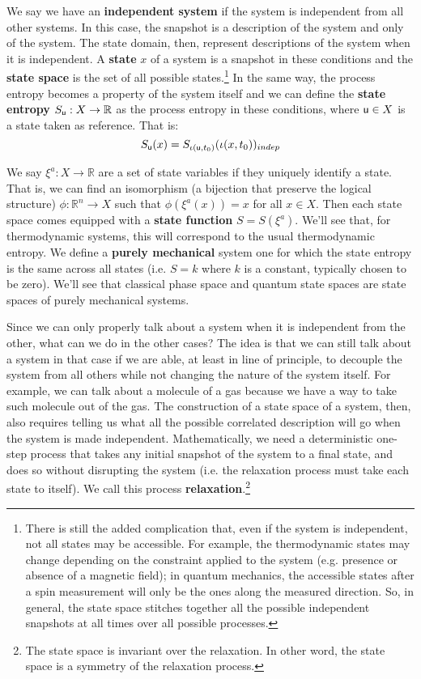 \documentclass[letterpaper]{article}
\begin{document}
We say we have an \textbf{independent system} if the system is independent from all other systems. In this case, the snapshot is a description of the system and only of the system. The state domain, then, represent descriptions of the system when it is independent. A \textbf{state} $x$ of a system is a snapshot in these conditions and the \textbf{state space} is the set of all possible states.\footnote{There is still the added complication that, even if the system is independent, not all states may be accessible. For example, the thermodynamic states may change depending on the constraint applied to the system (e.g. presence or absence of a magnetic field); in quantum mechanics, the accessible states after a spin measurement will only be the ones along the measured direction. So, in general, the state space stitches together all the possible independent snapshots at all times over all possible processes.} In the same way, the process entropy becomes a property of the system itself and we can define the \textbf{state entropy} $S_{\stmt[u]} : X \to \mathbb{R}$ as the process entropy in these conditions, where $\stmt[u] \in X$ is a state taken as reference. That is:
\begin{equation}
	S_{\stmt[u]}(x) = S_{\iota(\stmt[u], t_0)}(\iota( x, t_0))_{indep}
\end{equation}

We say $\xi^a : X \to \mathbb{R}$ are a set of state variables if they uniquely identify a state. That is, we can find an isomorphism (a bijection that preserve the logical structure) $\phi : \mathbb{R}^n \to X$ such that $\phi(\xi^a(x)) = x$ for all $x \in X$. Then each state space comes equipped with a \textbf{state function} $S=S(\xi^a)$. We'll see that, for thermodynamic systems, this will correspond to the usual thermodynamic entropy. We define a \textbf{purely mechanical} system one for which the state entropy is the same across all states (i.e. $S=k$ where $k$ is a constant, typically chosen to be zero). We'll see that classical phase space and quantum state spaces are state spaces of purely mechanical systems.

Since we can only properly talk about a system when it is independent from the other, what can we do in the other cases? The idea is that we can still talk about a system in that case if we are able, at least in line of principle, to decouple the system from all others while not changing the nature of the system itself. For example, we can talk about a molecule of a gas because we have a way to take such molecule out of the gas. The construction of a state space of a system, then, also requires telling us what all the possible correlated description will go when the system is made independent. Mathematically, we need a deterministic one-step process that takes any initial snapshot of the system to a final state, and does so without disrupting the system (i.e. the relaxation process must take each state to itself). We call this process \textbf{relaxation}.\footnote{The state space is invariant over the relaxation. In other word, the state space is a symmetry of the relaxation process.}
\end{document}
